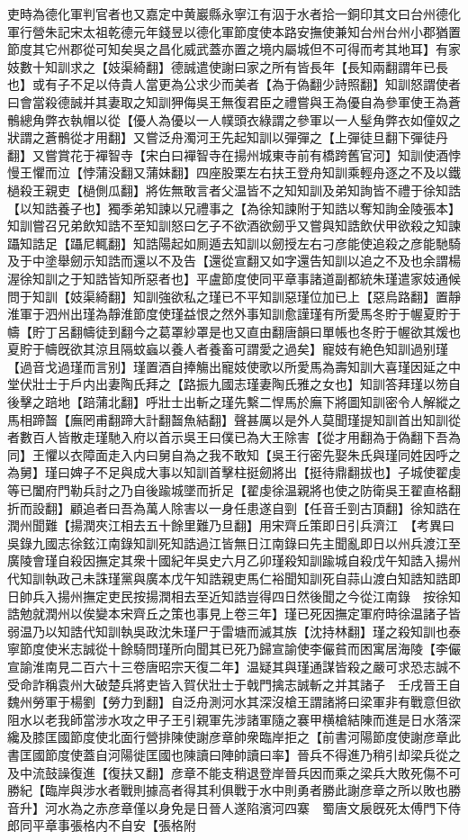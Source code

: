 吏時為德化軍判官者也又嘉定中黄巖縣永寧江有泅于水者拾一銅印其文曰台州德化軍行營朱記宋太祖乾德元年錢昱以德化軍節度使本路安撫使兼知台州台州小郡猶置節度其它州郡從可知矣吳之昌化威武蓋亦置之境内屬城但不可得而考其地耳】有家妓數十知訓求之【妓渠綺翻】德誠遣使謝曰家之所有皆長年【長知兩翻謂年已長也】或有子不足以侍貴人當更為公求少而美者【為于偽翻少詩照翻】知訓怒謂使者曰會當殺德誠并其妻取之知訓狎侮吳王無復君臣之禮嘗與王為優自為參軍使王為蒼鶻總角弊衣執帽以從【優人為優以一人幞頭衣綠謂之參軍以一人髽角弊衣如僮奴之狀謂之蒼鶻從才用翻】又嘗泛舟濁河王先起知訓以彈彈之【上彈徒旦翻下彈徒丹翻】又嘗賞花于襌智寺【宋白曰襌智寺在揚州城東寺前有橋跨舊官河】知訓使酒悖慢王懼而泣【悖蒲没翻又蒲妹翻】四座股栗左右扶王登舟知訓乘輕舟逐之不及以鐵檛殺王親吏【檛側瓜翻】將佐無敢言者父温皆不之知知訓及弟知詢皆不禮于徐知誥【以知誥養子也】獨季弟知諫以兄禮事之【為徐知諫附于知誥以奪知詢金陵張本】知訓嘗召兄弟飲知誥不至知訓怒曰乞子不欲酒欲劒乎又嘗與知誥飲伏甲欲殺之知諫躡知誥足【躡尼輒翻】知誥陽起如厠遁去知訓以劒授左右刁彦能使追殺之彦能馳騎及于中塗舉劒示知誥而還以不及告【還從宣翻又如字還告知訓以追之不及也余謂楊渥徐知訓之于知誥皆知所惡者也】平盧節度使同平章事諸道副都統朱瑾遣家妓通候問于知訓【妓渠綺翻】知訓強欲私之瑾已不平知訓惡瑾位加已上【惡烏路翻】置靜淮軍于泗州出瑾為靜淮節度使瑾益恨之然外事知訓愈謹瑾有所愛馬冬貯于幄夏貯于幬【貯丁呂翻幬徒到翻今之葛罩紗罩是也又直由翻唐韻曰單帳也冬貯于幄欲其煖也夏貯于幬旣欲其涼且隔蚊蝱以養人者養畜可謂愛之過矣】寵妓有絶色知訓過别瑾【過音戈過瑾而言别】瑾置酒自捧觴出寵妓使歌以所愛馬為壽知訓大喜瑾因延之中堂伏壯士于戶内出妻陶氏拜之【路振九國志瑾妻陶氏雅之女也】知訓答拜瑾以笏自後擊之踣地【踣蒲北翻】呼壯士出斬之瑾先繫二悍馬於廡下將圖知訓密令人解縱之馬相蹄齧【廡罔甫翻蹄大計翻齧魚結翻】聲甚厲以是外人莫聞瑾提知訓首出知訓從者數百人皆散走瑾馳入府以首示吳王曰僕已為大王除害【從才用翻為于偽翻下吾為同】王懼以衣障面走入内曰舅自為之我不敢知【吳王行密先娶朱氏與瑾同姓因呼之為舅】瑾曰婢子不足與成大事以知訓首擊柱挺劒將出【挺待鼎翻拔也】子城使翟虔等已闔府門勒兵討之乃自後踰城墜而折足【翟虔徐温親將也使之防衛吳王翟直格翻折而設翻】顧追者曰吾為萬人除害以一身任患遂自剄【任音壬剄古頂翻】徐知誥在潤州聞難【揚潤夾江相去五十餘里難乃旦翻】用宋齊丘策即日引兵濟江　【考異曰吳錄九國志徐鉉江南錄知訓死知誥過江皆無日江南錄曰先主聞亂即日以州兵渡江至廣陵會瑾自殺因撫定其衆十國紀年吳史六月乙卯瑾殺知訓踰城自殺戊午知誥入揚州代知訓執政己未誅瑾黨與廣本戊午知誥親吏馬仁裕聞知訓死自蒜山渡白知誥知誥即日帥兵入揚州撫定吏民按揚潤相去至近知誥豈得四日然後聞之今從江南錄　按徐知誥勉就潤州以俟變本宋齊丘之策也事見上卷三年】瑾已死因撫定軍府時徐温諸子皆弱温乃以知誥代知訓執吳政沈朱瑾尸于雷塘而滅其族【沈持林翻】瑾之殺知訓也泰寧節度使米志誠從十餘騎問瑾所向聞其已死乃歸宣諭使李儼貧而困寓居海陵【李儼宣諭淮南見二百六十三卷唐昭宗天復二年】温疑其與瑾通謀皆殺之嚴可求恐志誠不受命詐稱袁州大破楚兵將吏皆入賀伏壯士于戟門擒志誠斬之并其諸子　壬戌晉王自魏州勞軍于楊劉【勞力到翻】自泛舟測河水其深沒槍王謂諸將曰梁軍非有戰意但欲阻水以老我師當涉水攻之甲子王引親軍先涉諸軍隨之褰甲横槍結陳而進是日水落深纔及膝匡國節度使北面行營排陳使謝彦章帥衆臨岸拒之【前書河陽節度使謝彦章此書匡國節度使蓋自河陽徙匡國也陳讀曰陣帥讀曰率】晉兵不得進乃稍引却梁兵從之及中流鼓譟復進【復扶又翻】彦章不能支稍退登岸晉兵因而乘之梁兵大敗死傷不可勝紀【臨岸與涉水者戰則據高者得其利俱戰于水中則勇者勝此謝彦章之所以敗也勝音升】河水為之赤彦章僅以身免是日晉人遂陷濱河四寨　蜀唐文扆旣死太傅門下侍郎同平章事張格内不自安【張格附